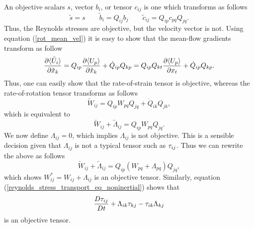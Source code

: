 \documentclass[oneside,a4paper,11pt]{report}
\begin{document}
An objective scalars $s$, vector $b_i$, or tensor $c_{ij}$ is one which transforms as follows
\begin{equation}
\tilde{s} = s \qquad \tilde{b}_i = Q_{ij}b_j \qquad \tilde{c}_{ij} = Q_{ip}c_{pq}Q_{jq}. 
\end{equation}
Thus, the Reynolds stresses are objective, but the velocity vector is not. Using equation (\ref{rot_mean_vel}) it is easy to show that the mean-flow gradients transform as follow
\begin{equation}
\label{grad_transformation}
\frac{\partial \langle \tilde{U}_i \rangle}{\partial \tilde{x}_k} = Q_{ip} \frac{\partial \langle U_p \rangle}{\partial \tilde{x}_k} + \dot{Q}_{ip}Q_{kp} = Q_{ip}Q_{kt} \frac{\partial \langle U_p \rangle}{\partial x_t} + \dot{Q}_{ip}Q_{kp}.
\end{equation}
Thus, one can easily show that the rate-of-strain tensor is objective, whereas the rate-of-rotation tensor transforms as follows
\begin{equation}
\tilde{W}_{ij} = Q_{ip}W_{pq}Q_{jq} + \dot{Q}_{ik}Q_{jk},
\end{equation}
which is equivalent to
\begin{equation}
\tilde{W}_{ij} + \tilde{\Lambda}_{ij}= Q_{ip}W_{pq}Q_{jq}.
\end{equation}
We now define $\Lambda_{ij} = 0$, which implies $\Lambda_{ij}$ is not objective. This is a sensible decision given that $\Lambda_{ij}$ is not a typical tensor such as $\tau_{ij}$. Thus we can rewrite the above as follows
\begin{equation}
\tilde{W}_{ij} + \tilde{\Lambda}_{ij}= Q_{ip} (W_{pq} + \Lambda_{pq} )Q_{jq},
\end{equation}
which shows $W^*_{ij} = W_{ij} + \Lambda_{ij}$ is an objective tensor. Similarly, equation (\ref{reynolds_stress_transport_eq_noninertial}) shows that 
\begin{equation}
\frac{D \tau_{ij}}{Dt} + \Lambda_{ik} \tau_{kj} - \tau_{ik} \Lambda_{kj}
\end{equation}
is an objective tensor.
\end{document}
